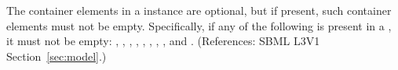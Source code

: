 The  container elements in a \Model instance are optional,
but if present, such container elements must not be empty.  Specifically,
if any of the following is present in a \Model, it must not be empty:
\ListOfFunctionDefinitions, \ListOfUnitDefinitions, \ListOfCompartments,
\ListOfSpecies, \ListOfParameters, \ListOfInitialAssignments, \ListOfRules,
\ListOfConstraints, \ListOfReactions and \ListOfEvents.  (References: SBML
L3V1 Section~\ref{sec:model}.)

